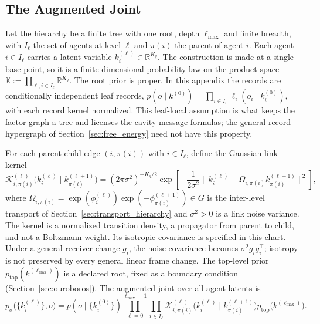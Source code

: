 \subsection{The Augmented Joint}

Let the hierarchy be a finite tree with one root, depth $\ell_{\max}$ and finite breadth, with $I_\ell$ the set of agents at level $\ell$ and $\pi(i)$ the parent of agent $i$. Each agent $i \in I_\ell$ carries a latent variable $k_i^{(\ell)} \in \mathbb{R}^{K_q}$. The construction is made at a single base point, so it is a finite-dimensional probability law on the product space $\mathbb{K} := \prod_{\ell, i \in I_\ell} \mathbb{R}^{K_q}$. The root prior is proper. In this appendix the records are conditionally independent leaf records, $p(o\mid k^{(0)})=\prod_{i\in I_0}\ell_i(o_i\mid k_i^{(0)})$, with each record kernel normalized. This leaf-local assumption is what keeps the factor graph a tree and licenses the cavity-message formulas; the general record hypergraph of Section~\ref{sec:free_energy} need not have this property.

\begin{definition}
\label{def:augmented_joint}
For each parent-child edge $(i, \pi(i))$ with $i \in I_\ell$, define the Gaussian link kernel
\begin{equation}
\mathcal{K}_{i,\pi(i)}^{(\ell)}\big(k_i^{(\ell)} \mid k_{\pi(i)}^{(\ell+1)}\big)
=
(2\pi\sigma^2)^{-K_q/2} \exp\left[-\frac{1}{2\sigma^2}
\big\|k_i^{(\ell)} - \Omega_{i,\pi(i)} k_{\pi(i)}^{(\ell+1)}\big\|^2\right],
\label{eq:gibbs_factor}
\end{equation}
where $\Omega_{i,\pi(i)} = \exp(\phi_i^{(\ell)})\exp(-\phi_{\pi(i)}^{(\ell+1)}) \in G$ is the inter-level transport of Section~\ref{sec:transport_hierarchy} and $\sigma^2 > 0$ is a link noise variance. The kernel is a normalized transition density, a propagator from parent to child, and not a Boltzmann weight. Its isotropic covariance is specified in this chart. Under a general receiver change $g_i$, the noise covariance becomes $\sigma^2g_ig_i^\top$; isotropy is not preserved by every general linear frame change. The top-level prior $p_{\mathrm{top}}(k^{(\ell_{\max})})$ is a declared root, fixed as a boundary condition (Section~\ref{sec:ouroboros}). The augmented joint over all agent latents is
\begin{equation}
p_{\sigma}\big(\{k_i^{(\ell)}\}, o\big)
=
p(o \mid \{k_i^{(0)}\}) \prod_{\ell = 0}^{\ell_{\max}-1} \prod_{i \in I_\ell} \mathcal{K}_{i,\pi(i)}^{(\ell)}\big(k_i^{(\ell)} \mid k_{\pi(i)}^{(\ell+1)}\big) p_{\mathrm{top}}\big(k^{(\ell_{\max})}\big).
\label{eq:augmented_joint}
\end{equation}
\end{definition}

